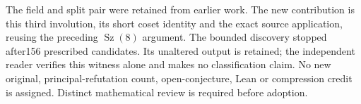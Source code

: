 \documentclass[11pt,a4paper]{article}
\newcommand{\Sz}{\operatorname{Sz}}
\begin{document}
The field and split pair were retained from earlier work. The new
contribution is this third involution, its short coset identity and
the exact source application, reusing the preceding $\Sz(8)$ argument.
The bounded discovery stopped after156 prescribed candidates. Its
unaltered output is retained; the independent reader verifies this
witness alone and makes no classification claim. No new original,
principal-refutation count, open-conjecture, Lean or compression credit
is assigned. Distinct mathematical review is required before adoption.
\end{document}
